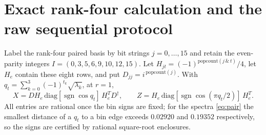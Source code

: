 \documentclass[11pt,a4paper]{article}
\newcommand{\sgn}{\operatorname{sgn}}
\begin{document}
\appendix

\section{Exact rank-four calculation and the raw sequential protocol}
\label{app:rank4}

Label the rank-four paired basis by bit strings $j=0,\dots,15$ and retain the even-parity integers $I=(0,3,5,6,9,10,12,15)$. Let $H_{jt}=(-1)^{\mathrm{popcount}(j\,\&\,t)}/4$, let $H_e$ contain these eight rows, and put $D_{jj}=i^{\,\mathrm{popcount}(j)}$. With $q_t=\sum_{k=0}^3(-1)^{t_k}\sqrt{\lambda_k}$, at $r=1$,
\begin{equation}
X=DH_e\,\mathrm{diag}[\sgn\cos q_t]\,H_e^{T}D^\dagger,\qquad Z=H_e\,\mathrm{diag}[\sgn\cos(\pi q_t/2)]\,H_e^{T}.
\end{equation}
All entries are rational once the bin signs are fixed; for the spectra \eqref{eq:pair} the smallest distance of a $q_t$ to a bin edge exceeds $0.02920$ and $0.19352$ respectively, so the signs are certified by rational square-root enclosures.
\end{document}
